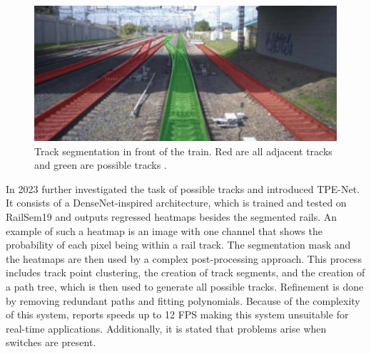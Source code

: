 \vspace{0.5cm}

\begin{figure}[H]
    \centering
    \includegraphics[width=0.5\linewidth]{PICs//semanticSegmentation/possibleTracks.jpg}
    \caption{Track segmentation in front of the train. Red are all adjacent tracks and green are possible tracks \cite{RailraodSemanticPossibleTracks2020}.}
    \label{fig:possibleTracks}
\end{figure}

\vspace{0.5cm}

\noindent In 2023 \cite{TPENet2023} further investigated the task of possible tracks and introduced \ac{TPE-Net}.
It consists of a DenseNet-inspired \cite{DenseNets} architecture, which is trained and tested on RailSem19 and outputs regressed heatmaps besides the segmented rails.
An example of such a heatmap is an image with one channel that shows the probability of each pixel being within a rail track.
The segmentation mask and the heatmaps are then used by a complex post-processing approach.
This process includes track point clustering, the creation of track segments, and the creation of a path tree, which is then used to generate all possible tracks.
Refinement is done by removing redundant paths and fitting polynomials.
Because of the complexity of this system, \cite{TPENet2023} reports speeds up to 12 \ac{FPS} making this system unsuitable for real-time applications.
Additionally, it is stated that problems arise when switches are present.


